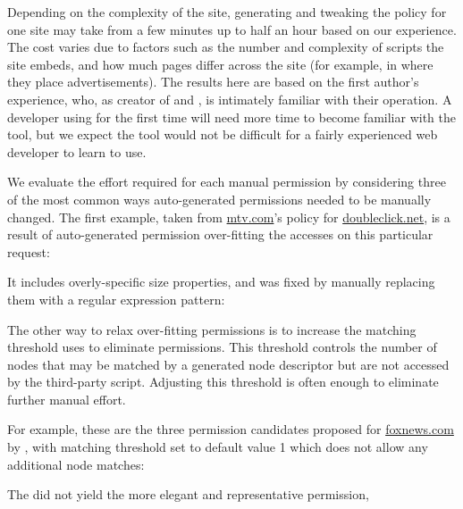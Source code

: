  Depending on the
complexity of the site, generating and tweaking the policy for one site
may take from a few minutes up to half an hour based on our experience.
The cost varies due to factors such as the number and complexity of
scripts the site embeds, and how much pages differ across the site (for
example, in where they place advertisements).  The results here are
based on the first author's experience, who, as creator of \pg and \vis,
is intimately familiar with their operation.  A developer using \pg for
the first time will need more time to become familiar with the tool, but
we expect the tool would not be difficult for a fairly experienced web
developer to learn to use.

We evaluate the effort required for each manual permission by
considering three of the most common ways auto-generated permissions
needed to be manually changed.  The first example, taken from
\url{mtv.com}'s policy for \url{doubleclick.net}, is a result of
auto-generated permission over-fitting the accesses on this particular
request:

\begin{algorithmic}[1]
	\Statex {}\par
\end{algorithmic}
\noindent
It includes overly-specific size properties, and was fixed by manually
replacing them with a regular expression pattern:

\begin{algorithmic}[1]
  \Statex {}\par
\end{algorithmic}

The other way to relax over-fitting permissions is to increase the
matching threshold \pg uses to eliminate permissions.  This threshold
controls the number of nodes that may be matched by a generated
node descriptor but are not accessed by the third-party script.  Adjusting this threshold is often enough to eliminate
further manual effort.

For example, these are the three permission candidates proposed for
\url{foxnews.com} by \pg, with matching threshold set to default value 1
which does not allow any additional node matches:

\begin{algorithmic}[1]
	\Statex {}\par
	\Statex {}\par
	\Statex {}\par
	\Statex {}\par
\end{algorithmic}
\noindent
The \pg did not yield the more elegant and representative permission,

